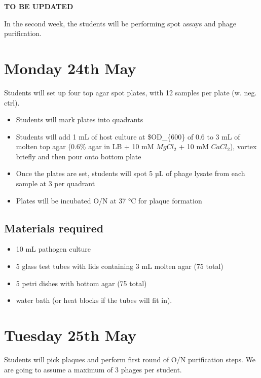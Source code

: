 \documentclass[
]{book}
\providecommand{\tightlist}{%
  \setlength{\itemsep}{0pt}\setlength{\parskip}{0pt}}
\begin{document}
\textbf{TO BE UPDATED}

In the second week, the students will be performing spot assays and phage purification.

\hypertarget{monday-24th-may}{%
\section{Monday 24th May}\label{monday-24th-may}}

Students will set up four top agar spot plates, with 12 samples per plate (w. neg. ctrl).

\begin{itemize}
\tightlist
\item
  Students will mark plates into quadrants
\item
  Students will add 1 mL of host culture at \$OD\_\{600\} of 0.6 to 3 mL of molten top agar (0.6\% agar in LB + 10 mM \(MgCl_{2}\) + 10 mM \(CaCl_{2}\)), vortex briefly and then pour onto bottom plate
\item
  Once the plates are set, students will spot 5 µL of phage lysate from each sample at 3 per quadrant
\item
  Plates will be incubated O/N at 37 °C for plaque formation
\end{itemize}

\hypertarget{materials-required}{%
\subsection{Materials required}\label{materials-required}}

\begin{itemize}
\tightlist
\item
  10 mL pathogen culture
\item
  5 glass test tubes with lids containing 3 mL molten agar (75 total)
\item
  5 petri dishes with bottom agar (75 total)
\item
  water bath (or heat blocks if the tubes will fit in).
\end{itemize}

\hypertarget{tuesday-25th-may}{%
\section{Tuesday 25th May}\label{tuesday-25th-may}}

Students will pick plaques and perform first round of O/N purification steps. We are going to assume a maximum of 3 phages per student.
\end{document}
